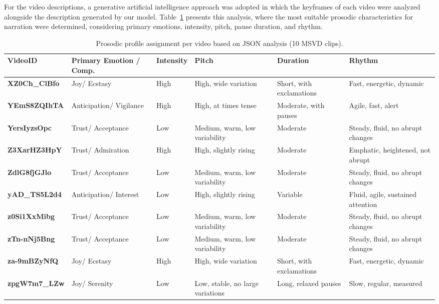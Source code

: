 \documentclass[pdflatex,iicol,sn-mathphys-num]{sn-jnl}%
\theoremstyle{thmstyleone}%
\theoremstyle{thmstyletwo}%
\theoremstyle{thmstylethree}%
\begin{document}
\noindent For the video descriptions, a generative artificial intelligence approach was adopted in which the keyframes of each video were analyzed alongside the description generated by our model. Table~\ref{tab:evaluacionemoc} presents this analysis, where the most suitable prosodic characteristics for narration were determined, considering primary emotions, intensity, pitch, pause duration, and rhythm.

\begin{table}[htbp]
    \centering
    \caption{Prosodic profile assignment per video based on JSON analysis (10 MSVD clips).}
    \label{tab:evaluacionemoc}
    \renewcommand{\arraystretch}{1}
    \setlength{\tabcolsep}{4pt}
    \small
    \begin{tabular}{p{2.5cm}p{2cm}p{1.3cm}p{2.6cm}p{2.4cm}p{3.4cm}}
        \toprule
        \textbf{VideoID} & \textbf{Primary Emotion / Comp.} & \textbf{Intensity} & \textbf{Pitch} & \textbf{Duration} & \textbf{Rhythm} \\
        \midrule
        \textbf{XZ0Ch\_ClBfo} & Joy/ Ecstasy & High & High, wide variation & Short, with exclamations & Fast, energetic, dynamic \\
        \textbf{YEmS8ZQIhTA} & Anticipation/ Vigilance & High & High, at times tense & Moderate, with pauses & Agile, fast, alert \\
        \textbf{YersIyzsOpc} & Trust/ Acceptance & Low & Medium, warm, low variability & Moderate & Steady, fluid, no abrupt changes \\
        \textbf{Z3XarHZ3HpY} & Trust/ Admiration & High & High, slightly rising & Moderate & Emphatic, heightened, not abrupt \\
        \textbf{ZdlG8fjGJlo} & Trust/ Acceptance & Low & Medium, warm, low variability & Moderate & Steady, fluid, no abrupt changes \\
        \textbf{yAD\_TS5L2d4} & Anticipation/ Interest & Low & High, slightly rising & Variable & Fluid, agile, sustained attention \\
        \textbf{z0Si1XxMibg} & Trust/ Acceptance & Low & Medium, warm, low variability & Moderate & Steady, fluid, no abrupt changes \\
        \textbf{zTn-nNj5Bng} & Trust/ Acceptance & Low & Medium, warm, low variability & Moderate & Steady, fluid, no abrupt changes \\
        \textbf{za-9mBZyNfQ} & Joy/ Ecstasy & High & High, wide variation & Short, with exclamations & Fast, energetic, dynamic \\
        \textbf{zpgW7m7\_LZw} & Joy/ Serenity & Low & Low, stable, no large variations & Long, relaxed pauses & Slow, regular, measured \\
        \bottomrule
    \end{tabular}
\end{table}
\end{document}
